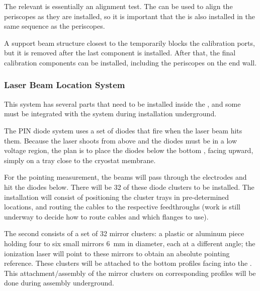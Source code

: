 The relevant  is essentially an alignment test.
The  can be used to align the periscopes as they are installed, so it is important that the  is also installed in the same sequence as the periscopes.





A support beam structure closest to the  temporarily blocks the calibration ports, but it is removed after the last  component is installed. After that, the final calibration components can be installed, including the periscopes on the  end wall. 

\subsubsection{Laser Beam Location System}
This system has several parts that need to be installed inside the , and some must be integrated with the 
 system during installation underground. 

The PIN diode system uses a set of diodes that fire when the laser beam hits them. Because the laser shoots from above and the diodes must be in a low voltage region, the plan is to place the diodes below the bottom , facing upward, simply on a tray close to the cryostat membrane.

For the pointing measurement, the beams will pass through the  electrodes and hit the diodes below. There will be \num{32} of these diode clusters to be installed. The installation will consist of positioning the cluster trays in pre-determined locations, and routing the cables to the respective feedthroughs (work is still underway to decide how to route cables and which flanges to use). 

The second  consists of a set of \num{32} mirror clusters: a plastic or aluminum piece holding four to six small mirrors \SI{6}{\mm} in diameter, each at a different angle; the ionization laser will point to these mirrors to obtain an absolute pointing reference. These clusters will be attached to the bottom  profiles facing into the . 
This attachment/assembly of the mirror clusters on corresponding  profiles will be done during  assembly underground.



